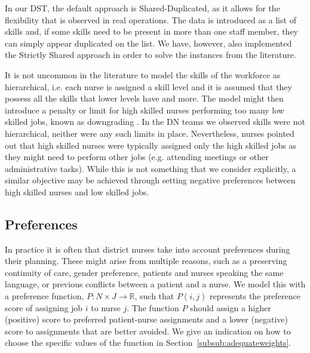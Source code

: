 \documentclass[a4paper,11pt,authoryear]{elsarticle}
\begin{document}
\noindent In our DST, the default approach is Shared-Duplicated, as it allows for the flexibility that is observed in real operations. The data is introduced as a list of skills and, if some skills need to be present in more than one staff member, they can simply appear duplicated on the list. We have, however, also implemented the Strictly Shared approach in order to solve the instances from the literature.

It is not uncommon in the literature to model the skills of the workforce as hierarchical, i.e. each nurse is assigned a skill level and it is assumed that they possess all the skills that lower levels have and more. The model might then introduce a penalty or limit for high skilled nurses performing too many low skilled jobs, known as downgrading \cite[see, for example,][]{fikar2015}. In the DN teams we observed skills were not hierarchical, neither were any such limits in place. Nevertheless, nurses pointed out that high skilled nurses were typically assigned only the high skilled jobs as they might need to perform other jobs (e.g. attending meetings or other administrative tasks). While this is not something that we consider explicitly, a similar objective may be achieved through setting negative preferences between high skilled nurses and low skilled jobs.

\subsection{Preferences}
\label{sub:preferences}
\noindent In practice it is often that district nurses take into account preferences during their planning. These might arise from multiple reasons, such as a preserving continuity of care, gender preference, patients and nurses speaking the same language, or previous conflicts between a patient and a nurse. We model this with a preference function, $P: N\times J \rightarrow \mathbb{R}$, such that $P(i,j)$ represents the preference score of assigning job $i$ to nurse $j$. The function $P$ should assign a higher (positive) score to preferred patient-nurse assignments and a lower (negative) score to assignments that are better avoided. We give an indication on how to choose the specific values of the function in Section~\ref{subsub:adequateweights}.

\end{document}
